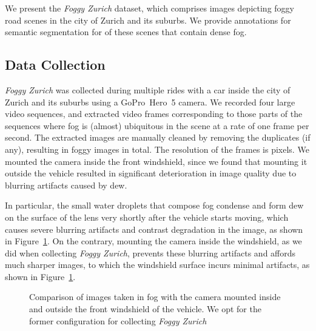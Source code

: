 \documentclass[twocolumn]{svjour3}          \smartqed  \usepackage{graphicx}
\begin{document}
We present the \emph{Foggy Zurich} dataset, which comprises  images depicting foggy road scenes in the city of Zurich and its suburbs. We provide annotations for semantic segmentation for  of these scenes that contain dense fog.

\subsection{Data Collection}

\emph{Foggy Zurich} was collected during multiple rides with a car inside the city of Zurich and its suburbs using a GoPro~Hero~5 camera. We recorded four large video sequences, and extracted video frames corresponding to those parts of the sequences where fog is (almost) ubiquitous in the scene at a rate of one frame per second. The extracted images are manually cleaned by removing the duplicates (if any), resulting in  foggy images in total. The resolution of the frames is  pixels. We mounted the camera inside the front windshield, since we found that mounting it outside the vehicle resulted in significant deterioration in image quality due to blurring artifacts caused by dew.

In particular, the small water droplets that compose fog condense and form dew on the surface of the lens very shortly after the vehicle starts moving, which causes severe blurring artifacts and contrast degradation in the image, as shown in Figure~\ref{fig:windshield}. On the contrary, mounting the camera inside the windshield, as we did when collecting \emph{Foggy Zurich}, prevents these blurring artifacts and affords much sharper images, to which the windshield surface incurs minimal artifacts, as shown in Figure~\ref{fig:windshield}.

\begin{figure}
  \centering
  \hfil
  \caption{Comparison of images taken in fog with the camera mounted \protect{} inside and \protect{} outside the front windshield of the vehicle. We opt for the former configuration for collecting \emph{Foggy Zurich}}
  \label{fig:windshield}
\end{figure}
\end{document}
